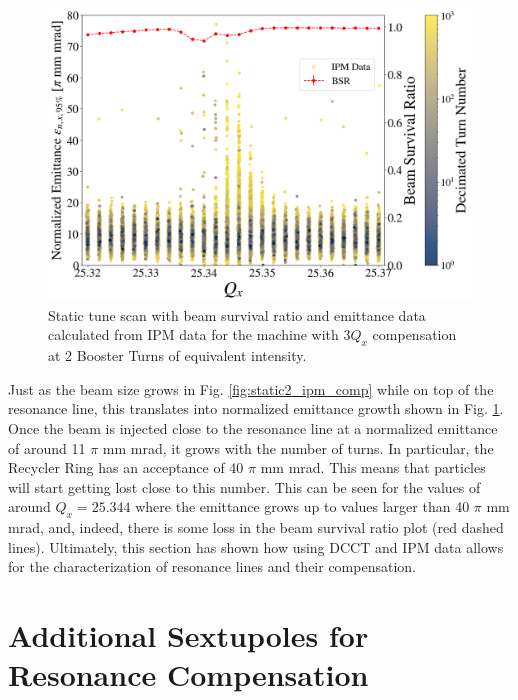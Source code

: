 \begin{figure}[H]
    \centering
    \includegraphics[width=\columnwidth]{chapter4/static2turns_emittance_comp.png}
    \caption{Static tune scan with beam survival ratio and emittance data calculated from IPM data for the machine with $3Q_x$ compensation at 2 Booster Turns of equivalent intensity.}
    \label{fig:static2_emit_comp}
\end{figure}

Just as the beam size grows in Fig. \ref{fig:static2_ipm_comp} while on top of the resonance line, this translates into normalized emittance growth shown in Fig. \ref{fig:static2_emit_comp}. Once the beam is injected close to the resonance line at a normalized emittance of around 11 $\pi$ mm mrad, it grows with the number of turns. In particular, the Recycler Ring has an acceptance of 40 $\pi$ mm mrad. This means that particles will start getting lost close to this number. This can be seen for the values of around $Q_x=25.344$ where the emittance grows up to values larger than 40 $\pi$ mm mrad, and, indeed, there is some loss in the beam survival ratio plot (red dashed lines). Ultimately, this section has shown how using DCCT and IPM data allows for the characterization of resonance lines and their compensation.

\section{Additional Sextupoles for Resonance Compensation}
\label{sec:addsexts}

